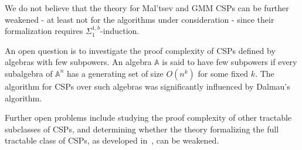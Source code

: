 \documentclass{article}
\theoremstyle{definition}
\theoremstyle{theorem}
\theoremstyle{theorem}
\theoremstyle{remark}
\theoremstyle{remark}
\theoremstyle{example}
\theoremstyle{notation}
\theoremstyle{theorem}
\begin{document}
We do not believe that the theory for Mal'tsev and GMM CSPs can be further weakened - at least not for the algorithms under consideration - since their formalization requires $\Sigma^{1,b}_1$-induction.
    
    An open question is to investigate the proof complexity of CSPs defined by algebras with few subpowers. An algebra $\mathbb{A}$ is said to have few subpowers if every subalgebra of $\mathbb{A}^n$ has a generating set of size $O(n^k)$ for some fixed $k$. The algorithm for CSPs over such algebras was significantly influenced by Dalmau's algorithm.

    Further open problems include studying the proof complexity of other tractable subclasses of CSPs, and determining whether the theory formalizing the full tractable class of CSPs, as developed in~\cite{gaysin2024}, can be weakened.









    


\end{document}
